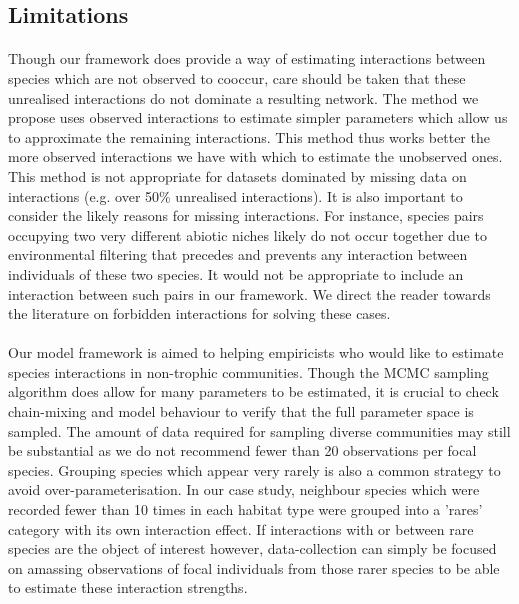 \documentclass[a4,12pt]{article}
\begin{document}
    \subsection{Limitations}
        
        \paragraph{}
        Though our framework does provide a way of estimating interactions between species which are not observed to cooccur, care should be taken that these unrealised interactions do not dominate a resulting network. The method we propose uses observed interactions to estimate simpler parameters which allow us to approximate the remaining interactions. This method thus works better the more observed interactions we have with which to estimate the unobserved ones. This method is not appropriate for datasets dominated by missing data on interactions (e.g. over 50\% unrealised interactions). It is also important to consider the likely reasons for missing interactions.  For instance, species pairs occupying two very different abiotic niches likely do not occur together due to environmental filtering that precedes and prevents any interaction between individuals of these two species. It would not be appropriate to include an interaction between such pairs in our framework. We direct the reader towards the literature on forbidden interactions \citep{Olesen2011, Jordano2016} for solving these cases. 

        \paragraph{}
        Our model framework is aimed to helping empiricists who would like to estimate species interactions in non-trophic communities. Though the MCMC sampling algorithm does allow for many parameters to be estimated, it is crucial to check chain-mixing and model behaviour to verify that the full parameter space is sampled. The amount of data required for sampling diverse communities may still be substantial as we do not recommend fewer than 20 observations per focal species. Grouping species which appear very rarely is also a common strategy to avoid over-parameterisation. In our case study, neighbour species which were recorded fewer than 10 times in each habitat type were grouped into a 'rares' category with its own interaction effect. If interactions with or between rare species are the object of interest however, data-collection can simply be focused on amassing observations of focal individuals from those rarer species to be able to estimate these interaction strengths.   
\end{document}
